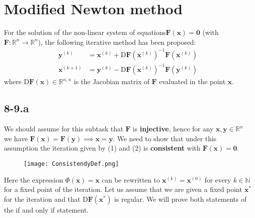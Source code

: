 \documentclass{article}
\newcommand\xk{\mathbf{x}^{\left(k\right)}}
\newcommand\xkn{\mathbf{x}^{\left(k+1\right)}}
\newcommand\yk{\mathbf{y}^{\left(k\right)}}
\begin{document}
\section*{Modified Newton method}
For the solution of the non-linear system of equations$\mathbf{F}\left(\mathbf{x}\right) = \textbf{0}$ (with $\mathbf{F}:\mathbb{R}^{n} \to \mathbb{R}^{n}$), the following iterative method has been proposed:
\begin{align}
    \yk &= \xk + \mathrm{D}\mathbf{F}\left(\xk\right)^{-1} \mathbf{F}\left(\xk\right) \\
    \xkn &= \yk - \mathrm{D}\mathbf{F}\left(\xk\right)^{-1} \mathbf{F}\left(\yk\right)
\end{align}
where $\mathrm{D}\mathbf{F}\left(\mathbf{x}\right) \in \mathbb{R}^{n,n}$ is the Jacobian matrix of $\mathbf{F}$ evaluated in the point $\mathbf{x}$.

\subsection*{8-9.a}
We should assume for this subtask that $\mathbf{F}$ is \textbf{injective}, hence for any $\mathbf{x}, \mathbf{y} \in \mathbb{R}^{n}$ we have $\mathbf{F}\left(\mathbf{x}\right) = \mathbf{F}\left(\mathbf{y}\right) \implies \mathbf{x} = \mathbf{y}$. We need to show that under this assumption the iteration given by (1) and (2) is \textbf{consistent} with $\mathbf{F}\left(\mathbf{x}\right) = \mathbf{0}$.

\begin{figure}[!hbt]
    \centering
    \texttt{[image: ConsistendyDef.png]}
\end{figure}
\noindent Here the expression $\Phi\left(\mathbf{x}\right) = \mathbf{x}$ can be rewritten to $\xk = \mathbf{x}^{\left(0\right)}$ for every $k \in \mathbb{N}$ for a fixed point of the iteration. Let us assume that we are given a fixed point $\mathbf{x}^{*}$ for the iteration and that $\mathrm{D}\mathbf{F}\left(\mathbf{x}^{*}\right)$ is regular. We will prove both statements of the if and only if statement.
\end{document}
